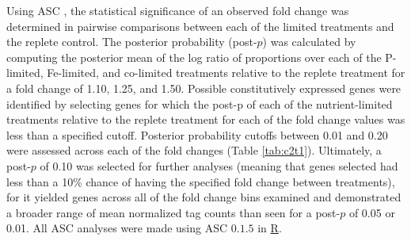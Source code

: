 Using ASC \citep{Wu2010}, the statistical significance of an observed fold change was determined in pairwise comparisons between each of the limited treatments and the replete control. The posterior probability (post-$p$) was calculated by computing the posterior mean of the log ratio of proportions over each of the P-limited, Fe-limited, and co-limited treatments relative to the replete treatment for a fold change of 1.10, 1.25, and 1.50. Possible constitutively expressed genes were identified by selecting genes for which the post-p of each of the nutrient-limited treatments relative to the replete treatment for each of the fold change values was less than a specified cutoff. Posterior probability cutoffs between 0.01 and 0.20 were assessed across each of the fold changes (Table \ref{tab:c2t1}). Ultimately, a post-$p$ of 0.10 was selected for further analyses (meaning that genes selected had less than a 10\% chance of having the specified fold change between treatments), for it yielded genes across all of the fold change bins examined and demonstrated a broader range of mean normalized tag counts than seen for a post-$p$ of 0.05 or 0.01. All ASC analyses were made using ASC $0.1.5$ in \href{http://R-project.org}{R}. \par

